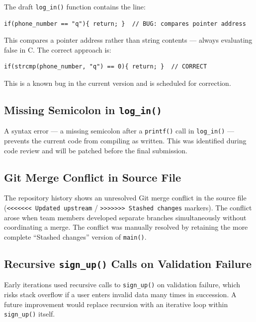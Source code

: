 \documentclass[12pt, a4paper]{article}
\begin{document}
The draft \texttt{log\_in()} function contains the line:

\begin{lstlisting}[caption={Bug: pointer comparison instead of string comparison}]
if(phone_number == "q"){ return; }  // BUG: compares pointer address
\end{lstlisting}

This compares a pointer address rather than string contents — always evaluating false in
C. The correct approach is:

\begin{lstlisting}[caption={Fix: use \texttt{strcmp()}}]
if(strcmp(phone_number, "q") == 0){ return; }  // CORRECT
\end{lstlisting}

This is a known bug in the current version and is scheduled for correction.

\subsection{Missing Semicolon in \texttt{log\_in()}}

A syntax error — a missing semicolon after a \texttt{printf()} call in \texttt{log\_in()} —
prevents the current code from compiling as written. This was identified during code review
and will be patched before the final submission.

\subsection{Git Merge Conflict in Source File}

The repository history shows an unresolved Git merge conflict in the source file
(\texttt{<<<<<<< Updated upstream} / \texttt{>>>>>>> Stashed changes} markers). The
conflict arose when team members developed separate branches simultaneously without
coordinating a merge. The conflict was manually resolved by retaining the more complete
``Stashed changes'' version of \texttt{main()}.

\subsection{Recursive \texttt{sign\_up()} Calls on Validation Failure}

Early iterations used recursive calls to \texttt{sign\_up()} on validation failure, which
risks stack overflow if a user enters invalid data many times in succession. A future
improvement would replace recursion with an iterative loop within \texttt{sign\_up()}
itself.
\end{document}

